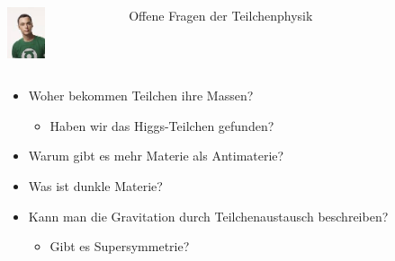 \documentclass{beamer}
\begin{document}
\begin{frame}[t]
  \vskip0.4cm
  \begin{columns}
   \begin{column}{0.2\textwidth}
     \centering
      \includegraphics[height=1.5cm]{eyecandy/Sheldon}
    \end{column}
    \begin{column}{0.6\textwidth}
      \alert{\Large Offene Fragen der Teilchenphysik}
    \end{column}
    \begin{column}{0.2\textwidth}
    \end{column}
  \end{columns}
  \vskip0.5cm
  \begin{columns}
    \begin{column}{0.7\textwidth}
      \begin{itemize}
        \pause
      \item Woher bekommen Teilchen ihre Massen?
        \begin{itemize}
        \item Haben wir das Higgs-Teilchen gefunden?
        \end{itemize}
        \pause
      \item Warum gibt es mehr Materie als Antimaterie?
        \pause
      \item Was ist dunkle Materie?
      \item Kann man die Gravitation durch Teilchenaustausch beschreiben?
        \begin{itemize}
        \item Gibt es Supersymmetrie?
        \end{itemize}
      \end{itemize}
    \end{column}
    \begin{column}{0.3\textwidth}
      \centering

\end{column}
\end{columns}
\end{frame}
\end{document}
